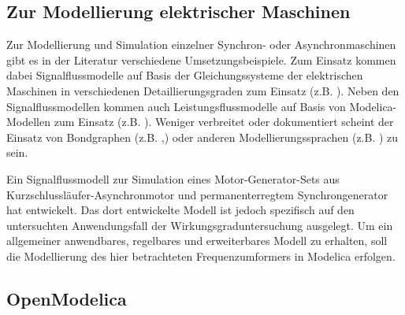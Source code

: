 \subsection{Zur Modellierung elektrischer Maschinen}
\label{subsec:ModellierungElektrischerMaschinen}
Zur Modellierung und Simulation einzelner Synchron- oder Asynchronmaschinen gibt es in der Literatur verschiedene Umsetzungsbeispiele. Zum Einsatz kommen dabei Signalflussmodelle auf Basis der Gleichungssysteme der elektrischen Maschinen in verschiedenen Detaillierungsgraden zum Einsatz (z.B. \cites{kutznerModellierungUndSimulation2010a,alibrahimSimulationsmodellDoppeltGespeisten2017,razakModellingSimulationElectric2021}). Neben den Signalflussmodellen kommen auch Leistungsflussmodelle auf Basis von Modelica-Modellen zum Einsatz (z.B. \cites{calisModelicaSimulationFeldorientiertGeregelten,frankeMultidisziplinareModellierungUnd2012,}). Weniger verbreitet oder dokumentiert scheint der Einsatz von Bondgraphen (z.B. \cite{sahmTwoaxisBondGraph1979},\cite[S.~269-321]{borutzkyBondGraphModelling2011}) oder anderen Modellierungssprachen (z.B. \cite{justusDynamischesVerhaltenElektrischer1993}) zu sein. 

Ein Signalflussmodell zur Simulation eines Motor-Generator-Sets aus Kurzschlussläufer-Asynchronmotor und permanenterregtem Synchrongenerator hat \cite{razakModellingSimulationElectric2021} entwickelt. Das dort entwickelte Modell ist jedoch spezifisch auf den untersuchten Anwendungsfall der Wirkungsgraduntersuchung ausgelegt. Um ein allgemeiner anwendbares, regelbares und erweiterbares Modell zu erhalten, soll die Modellierung des hier betrachteten Frequenzumformers in Modelica erfolgen.

\subsection{OpenModelica}
\label{subsec:OpenModelica}












